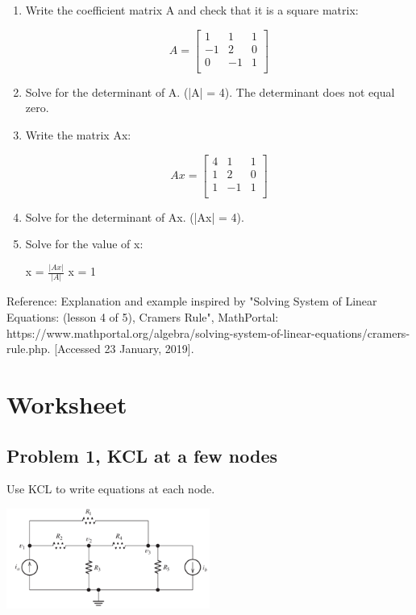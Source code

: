 \documentclass[11pt]{book}
\begin{document}
\begin{enumerate}
	\item Write the coefficient matrix A and check that it is a square matrix:
		\begin{center}
		\[
  		A=
  		\left[ {\begin{array}{ccc}
   		1 & 1 & 1\\
   		-1 & 2 & 0\\
   		0 & -1 & 1\\
  		\end{array} } \right]
		\]
		\end{center}
	\item Solve for the determinant of A. (|A| = 4). The determinant does not equal zero.
	\item Write the matrix Ax:
		\begin{center}
		\[
  		Ax=
  		\left[ {\begin{array}{ccc}
   		4 & 1 & 1\\
   		1 & 2 & 0\\
   		1 & -1 & 1\\
  		\end{array} } \right]
		\]
		\end{center}
	\item Solve for the determinant of Ax. (|Ax| = 4). 
	\item Solve for the value of x:
		\begin{center}
		x = $\frac{|Ax|}{|A|}$
		x = 1
		\end{center}
\end{enumerate}

Reference: Explanation and example inspired by "Solving System of Linear Equations: (lesson 4 of 5), Cramers Rule", MathPortal: https://www.mathportal.org/algebra/solving-system-of-linear-equations/cramers-rule.php. [Accessed 23 January, 2019].


\newpage

\section{Worksheet}
\subsection{Problem 1, KCL at a few nodes}
Use KCL to write equations at each node.
\begin{center}
	\includegraphics[width=0.5\textwidth]{figures/04.problem1.png}
\end{center}
\end{document}
